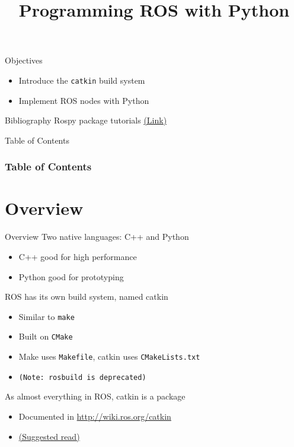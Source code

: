 \documentclass[10pt,compress]{beamer} %
\title[Programming ROS with Python]{Programming ROS with Python}
\author{}
\institute{\asignatura}
\date{}
\begin{document}
{\titlepageBlue
    \begin{frame}
        \titlepage
    \end{frame}
}

\begin{frame}[plain]{}
   \begin{block}{Objectives}
       \begin{itemize}
	   	\item Introduce the \texttt{catkin} build system
       	\item Implement ROS nodes with Python
       \end{itemize}
   \end{block}

   \begin{block}{Bibliography}
       Rospy package tutorials \href{http://wiki.ros.org/rospy/Tutorials}{(Link)}
   \end{block}

\end{frame}

{
\eliminarNavegacion
\begin{frame}[shrink]{Table of Contents}
 \frametitle{Table of Contents}
 \tableofcontents
\end{frame}
}

\section{Overview}

\begin{frame}{Overview}
	Two native languages: C++ and Python
	\begin{itemize}
		\item C++ good for high performance
		\item Python good for prototyping
  	\end{itemize}
	ROS has its own build system, named \alert{catkin}
	\begin{itemize}
		\item Similar to \texttt{make}
		\item Built on \texttt{CMake}
		\item Make uses \texttt{Makefile}, catkin uses \texttt{CMakeLists.txt}
		\item[] \texttt{(Note: \texttt{rosbuild} is deprecated)}
  	\end{itemize}
	As almost everything in ROS, catkin is a package
	\begin{itemize}
		\item Documented in \url{http://wiki.ros.org/catkin}
		\item \href{http://wiki.ros.org/catkin/conceptual\_overview}{(Suggested read)}
	\end{itemize}
\end{frame}
\end{document}
